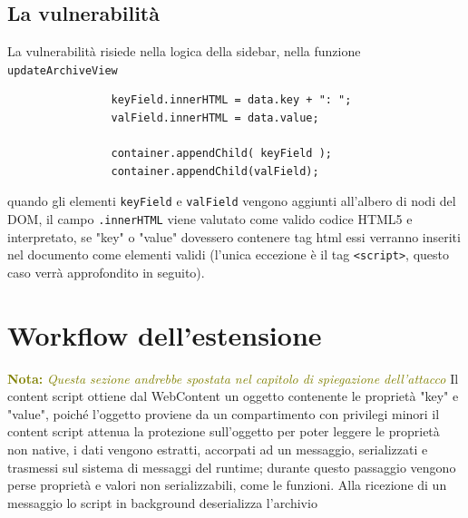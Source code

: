 \documentclass[]{sapthesis}
\newcommand{\MComment}[3]{\textcolor{#3}{ \textbf{#1} \textit{#2}}}
\newcommand{\Nota}[1]{\MComment{Nota:}{#1}{olive}}
\newcommand{\code}[1]{\texttt{#1}}
\begin{document}
        \subsection{La vulnerabilità}
            La vulnerabilità risiede nella logica della sidebar, nella funzione \code{updateArchiveView}

            \begin{lstlisting}
                keyField.innerHTML = data.key + ": ";
                valField.innerHTML = data.value;
        
                container.appendChild( keyField );
                container.appendChild(valField);
            \end{lstlisting}

            quando gli elementi \code{keyField} e \code{valField} vengono aggiunti all'albero di nodi
            del DOM, il campo \code{.innerHTML} viene valutato come valido codice HTML5 e interpretato,
            se "key" o "value" dovessero contenere tag html essi verranno inseriti nel documento come
            elementi validi (l'unica eccezione è il tag \code{<script>}, questo caso verrà approfondito
            in seguito).

        \section{Workflow dell'estensione}
            \Nota{Questa sezione andrebbe spostata nel capitolo di spiegazione dell'attacco}
            Il content script ottiene dal WebContent un oggetto contenente le proprietà "key" e "value",
            poiché l'oggetto proviene da un compartimento con privilegi minori il content script attenua
            la protezione sull'oggetto per poter leggere le proprietà non native, i dati vengono estratti,
            accorpati ad un messaggio, serializzati e trasmessi sul sistema di messaggi del runtime;
            durante questo passaggio vengono perse proprietà e valori non serializzabili, come le funzioni.
            Alla ricezione di un messaggio lo script in background deserializza l'archivio


\newpage{}
\end{document}
